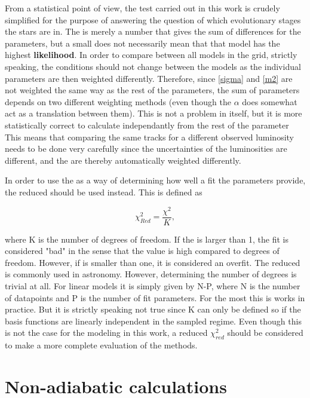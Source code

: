 From a statistical point of view, the \chis test carried out in this work is crudely simplified for the purpose of answering the question of which evolutionary stages the stars are in. The \chis is merely a number that gives the sum of differences for the parameters, but a small \chis does not necessarily mean that that model has the highest \textbf{likelihood}. In order to compare \chis between all models in the grid, strictly speaking, the conditions should not change between the models as the individual parameters are then weighted differently. Therefore, since \eqref{sigma} and \eqref{m2} are not weighted the same way as the rest of the parameters, the sum of parameters depends on two different weighting methods (even though the $\alpha$ does somewhat act as a translation between them). This is not a problem in itself, but it is more statistically correct to calculate \chis independantly from the rest of the parameter  This means that comparing the same tracks for a different observed luminosity needs to be done very carefully since the uncertainties of the luminosities are different, and the \chis are thereby automatically weighted differently.

In order to use the \chis as a way of determining how well a fit the parameters provide,  the reduced \chis should be used instead. This is defined as 

\begin{equation}
	\chi_{Red}^2 = \frac{\chi^2}{K} ,
\end{equation}

where K is the number of degrees of freedom. If the \chis is larger than 1, the fit is considered "bad" in the sense that the value is high compared to degrees of freedom. However, if \chis is smaller than one, it is considered an overfit. The reduced \chis is commonly used in astronomy. However, determining the number of degrees is trivial at all. For linear models it is simply given by N-P, where N is the number of datapoints and P is the number of fit parameters. For the most this is works in practice. But it is strictly speaking not true  since K can only be defined so if the basis functions are linearly independent in the sampled regime. Even though this is not the case for the modeling in this work, a reduced \chis $\chi_{red}^2$ should be considered to make a more complete evaluation of the \chis methods. 

\section{Non-adiabatic calculations}

